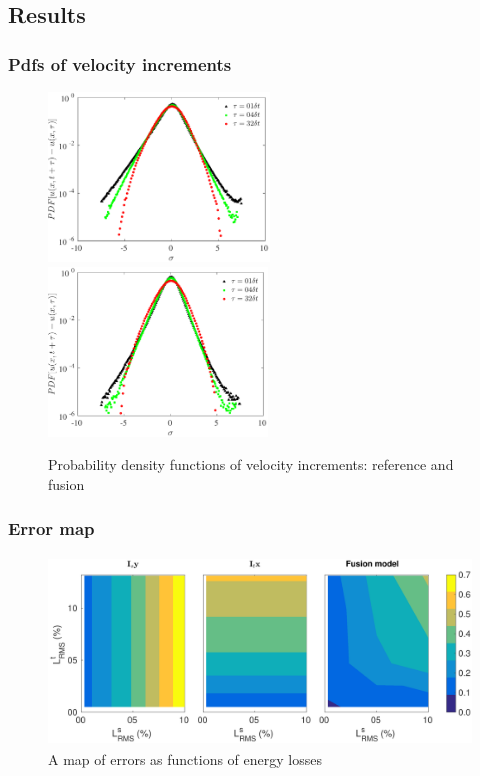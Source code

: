 \documentclass{beamer}
\begin{document}
\subsection{Results}
\begin{frame}
	\frametitle{Pdfs of velocity increments} 
	\begin{figure}
	\centering
		\includegraphics[height=4.5cm]{./figures/comparisons/channel/pdf_org.pdf}
		\hfill
		\includegraphics[height=4.5cm]{./figures/comparisons/channel/pdf_fusion.pdf}
		\caption{Probability density functions of velocity increments: reference and fusion}
	\end{figure}
\end{frame}

\begin{frame}
	\frametitle{Error map} 
	\begin{figure}
	\centering
		\includegraphics[height=5cm]{./figures/DNSdataset/fusion/errorsmap_average_allscales.png}
		\caption{A map of errors as functions of energy losses}
	\end{figure}
\end{frame}
\end{document}
